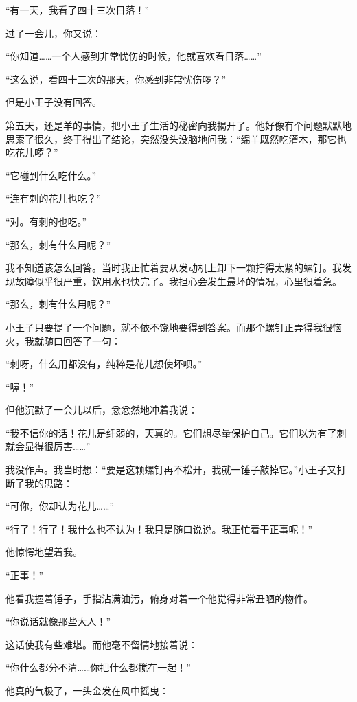 “有一天，我看了四十三次日落！”

过了一会儿，你又说：

“你知道\ldots{}\ldots{}一个人感到非常忧伤的时候，他就喜欢看日落\ldots{}\ldots{}”

“这么说，看四十三次的那天，你感到非常忧伤啰？”

但是小王子没有回答。


\stoptitle

\starttitle[title={7},reference={part0009.html_a010}]

第五天，还是羊的事情，把小王子生活的秘密向我揭开了。他好像有个问题默默地思索了很久，终于得出了结论，突然没头没脑地问我：“绵羊既然吃灌木，那它也吃花儿啰？”

“它碰到什么吃什么。”

“连有刺的花儿也吃？”

“对。有刺的也吃。”

“那么，刺有什么用呢？”

我不知道该怎么回答。当时我正忙着要从发动机上卸下一颗拧得太紧的螺钉。我发现故障似乎很严重，饮用水也快完了。我担心会发生最坏的情况，心里很着急。

“那么，刺有什么用呢？”

小王子只要提了一个问题，就不依不饶地要得到答案。而那个螺钉正弄得我很恼火，我就随口回答了一句：

“刺呀，什么用都没有，纯粹是花儿想使坏呗。”

“喔！”

但他沉默了一会儿以后，忿忿然地冲着我说：

“我不信你的话！花儿是纤弱的，天真的。它们想尽量保护自己。它们以为有了刺就会显得很厉害\ldots{}\ldots{}”

我没作声。我当时想：“要是这颗螺钉再不松开，我就一锤子敲掉它。”小王子又打断了我的思路：

“可你，你却认为花儿\ldots{}\ldots{}”

“行了！行了！我什么也不认为！我只是随口说说。我正忙着干正事呢！”

他惊愕地望着我。

“正事！”

他看我握着锤子，手指沾满油污，俯身对着一个他觉得非常丑陋的物件。

“你说话就像那些大人！”

这话使我有些难堪。而他毫不留情地接着说：

“你什么都分不清\ldots{}\ldots{}你把什么都搅在一起！”

他真的气极了，一头金发在风中摇曳：

